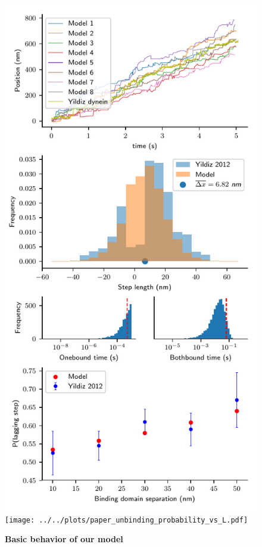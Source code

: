 \documentclass[9pt,twocolumn,twoside]{pnas-new}
\begin{document}
\begin{figure}[tbhp]
  \centering
  \includegraphics[width=\linewidth]{../../plots/paper_model_behavior}
  \texttt{[image: ../../plots/paper\_unbinding\_probability\_vs\_L.pdf]}
\caption{\textbf{Basic behavior of our model}}
\label{fig:}
\end{figure}
\end{document}
